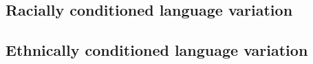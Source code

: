     \subsection{Racially conditioned language variation}
    \subsection{Ethnically conditioned language variation}
